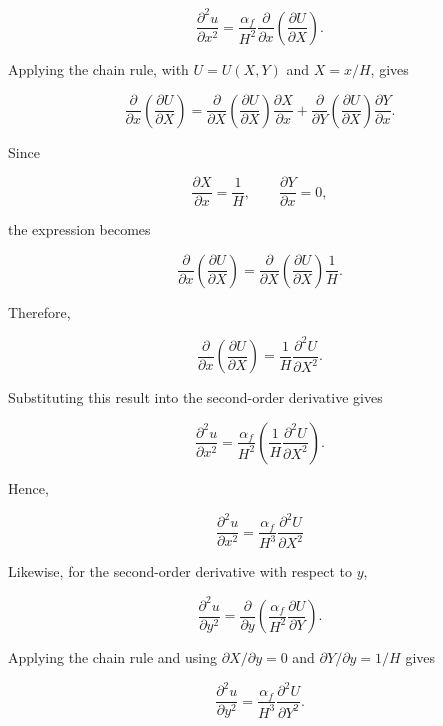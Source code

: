 \documentclass[preprint,3p,number]{elsarticle}
\begin{document}
\[
\frac{\partial^2 u}{\partial x^2}
=
\frac{\alpha_f}{H^2}
\frac{\partial}{\partial x}
\left(\frac{\partial U}{\partial X}\right).
\]

Applying the chain rule, with \(U=U(X,Y)\) and \(X=x/H\), gives

\[
\frac{\partial}{\partial x}
\left(\frac{\partial U}{\partial X}\right)
=
\frac{\partial}{\partial X}
\left(\frac{\partial U}{\partial X}\right)
\frac{\partial X}{\partial x}
+
\frac{\partial}{\partial Y}
\left(\frac{\partial U}{\partial X}\right)
\frac{\partial Y}{\partial x}.
\]

Since

\[
\frac{\partial X}{\partial x}=\frac{1}{H},
\qquad
\frac{\partial Y}{\partial x}=0,
\]

the expression becomes

\[
\frac{\partial}{\partial x}
\left(\frac{\partial U}{\partial X}\right)
=
\frac{\partial}{\partial X}
\left(\frac{\partial U}{\partial X}\right)
\frac{1}{H}.
\]

Therefore,

\[
\frac{\partial}{\partial x}
\left(\frac{\partial U}{\partial X}\right)
=
\frac{1}{H}
\frac{\partial^2 U}{\partial X^2}.
\]

Substituting this result into the second-order derivative gives

\[
\frac{\partial^2 u}{\partial x^2}
=
\frac{\alpha_f}{H^2}
\left(
\frac{1}{H}
\frac{\partial^2 U}{\partial X^2}
\right).
\]

Hence,

\begin{equation}
\frac{\partial^2 u}{\partial x^2}
=
\frac{\alpha_f}{H^3}
\frac{\partial^2 U}{\partial X^2}
\label{eq:31}
\end{equation}

Likewise, for the second-order derivative with respect to \(y\),

\begin{equation}
\frac{\partial^2u}{\partial y^2}
=
\frac{\partial}{\partial y}
\left(
\frac{\alpha_f}{H^2}
\frac{\partial U}{\partial Y}
\right).
\end{equation}

Applying the chain rule and using
\(\partial X/\partial y=0\) and
\(\partial Y/\partial y=1/H\) gives

\begin{equation}
\frac{\partial^2u}{\partial y^2}
=
\frac{\alpha_f}{H^3}
\frac{\partial^2U}{\partial Y^2}.
\label{eq:d2u_dy2}
\end{equation}
\end{document}
